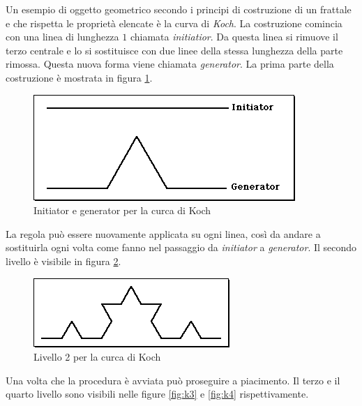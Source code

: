 \documentclass[11pt,a4paper]{scrreprt}
\begin{document}


Un esempio di oggetto geometrico secondo i principi di costruzione di un frattale e che rispetta le proprietà elencate è la curva di \textit{Koch}. La costruzione comincia con una linea di lunghezza $1$ chiamata \textit{initiatior}. Da questa linea si rimuove il terzo centrale e lo si sostituisce con due linee della stessa lunghezza della parte rimossa. Questa nuova forma viene chiamata \textit{generator}. La prima parte della costruzione è mostrata in figura \ref{fig:k1}.

\begin{figure}[!ht]
\centering
\includegraphics[scale=0.55]{images/koch1.png}
\caption{Initiator e generator per la curca di Koch}
\label{fig:k1}
\end{figure}

La regola può essere nuovamente applicata su ogni linea, così da andare a sostituirla ogni volta come fanno nel passaggio da \textit{initiator} a \textit{generator}. Il secondo livello è visibile in figura \ref{fig:k2}.

\begin{figure}[!ht]
\centering
\includegraphics[scale=0.55]{images/koch2.png}
\caption{Livello 2 per la curca di Koch}
\label{fig:k2}
\end{figure}

\FloatBarrier

Una volta che la procedura è avviata può proseguire a piacimento. Il terzo e il quarto livello sono visibili nelle figure \ref{fig:k3} e \ref{fig:k4} rispettivamente.
\end{document}
